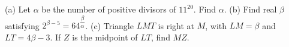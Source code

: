 (a) Let $\alpha$ be the number of positive divisors of $11^{20}$. Find $\alpha$. (b) Find real $\beta$ satisfying $2^{\beta-5}=64^{\dfrac{\beta}{\alpha}}$. (c) Triangle $LMT$ is right at $M$, with $LM=\beta$ and $LT=4\beta-3$. If $Z$ is the midpoint of $LT$, find $MZ$.
